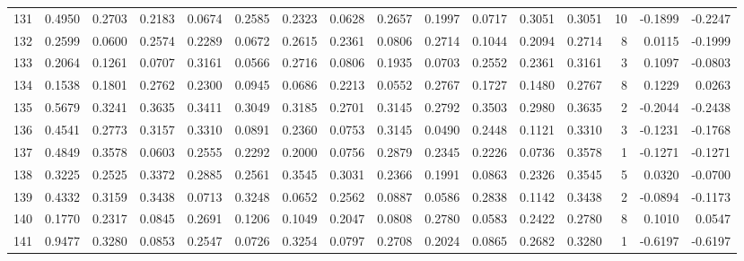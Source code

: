 \begin{tabular}{lrrrrrrrrrrrrrrr}
131 &      0.4950 &  0.2703 &  0.2183 &  0.0674 &  0.2585 &  0.2323 &  0.0628 &  0.2657 &  0.1997 &  0.0717 &   0.3051 &     0.3051 &     10 &                   -0.1899 &                    -0.2247 \\
132 &      0.2599 &  0.0600 &  0.2574 &  0.2289 &  0.0672 &  0.2615 &  0.2361 &  0.0806 &  0.2714 &  0.1044 &   0.2094 &     0.2714 &      8 &                    0.0115 &                    -0.1999 \\
133 &      0.2064 &  0.1261 &  0.0707 &  0.3161 &  0.0566 &  0.2716 &  0.0806 &  0.1935 &  0.0703 &  0.2552 &   0.2361 &     0.3161 &      3 &                    0.1097 &                    -0.0803 \\
134 &      0.1538 &  0.1801 &  0.2762 &  0.2300 &  0.0945 &  0.0686 &  0.2213 &  0.0552 &  0.2767 &  0.1727 &   0.1480 &     0.2767 &      8 &                    0.1229 &                     0.0263 \\
135 &      0.5679 &  0.3241 &  0.3635 &  0.3411 &  0.3049 &  0.3185 &  0.2701 &  0.3145 &  0.2792 &  0.3503 &   0.2980 &     0.3635 &      2 &                   -0.2044 &                    -0.2438 \\
136 &      0.4541 &  0.2773 &  0.3157 &  0.3310 &  0.0891 &  0.2360 &  0.0753 &  0.3145 &  0.0490 &  0.2448 &   0.1121 &     0.3310 &      3 &                   -0.1231 &                    -0.1768 \\
137 &      0.4849 &  0.3578 &  0.0603 &  0.2555 &  0.2292 &  0.2000 &  0.0756 &  0.2879 &  0.2345 &  0.2226 &   0.0736 &     0.3578 &      1 &                   -0.1271 &                    -0.1271 \\
138 &      0.3225 &  0.2525 &  0.3372 &  0.2885 &  0.2561 &  0.3545 &  0.3031 &  0.2366 &  0.1991 &  0.0863 &   0.2326 &     0.3545 &      5 &                    0.0320 &                    -0.0700 \\
139 &      0.4332 &  0.3159 &  0.3438 &  0.0713 &  0.3248 &  0.0652 &  0.2562 &  0.0887 &  0.0586 &  0.2838 &   0.1142 &     0.3438 &      2 &                   -0.0894 &                    -0.1173 \\
140 &      0.1770 &  0.2317 &  0.0845 &  0.2691 &  0.1206 &  0.1049 &  0.2047 &  0.0808 &  0.2780 &  0.0583 &   0.2422 &     0.2780 &      8 &                    0.1010 &                     0.0547 \\
141 &      0.9477 &  0.3280 &  0.0853 &  0.2547 &  0.0726 &  0.3254 &  0.0797 &  0.2708 &  0.2024 &  0.0865 &   0.2682 &     0.3280 &      1 &                   -0.6197 &                    -0.6197 \\

\end{tabular}

